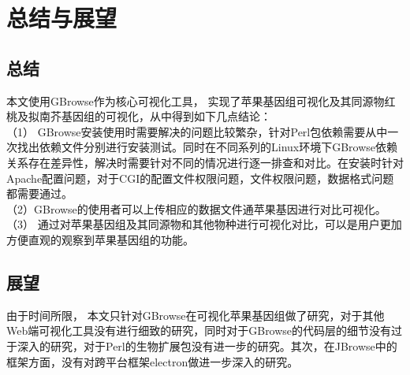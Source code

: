 \chapter{总结与展望}
	\section{总结}
	本文使用GBrowse作为核心可视化工具， 实现了苹果基因组可视化及其同源物红桃及拟南芥基因组的可视化，从中得到如下几点结论：\\
	\indent（1） GBrowse安装使用时需要解决的问题比较繁杂，针对Perl包依赖需要从中一次找出依赖文件分别进行安装测试。同时在不同系列的Linux环境下GBrowse依赖关系存在差异性，解决时需要针对不同的情况进行逐一排查和对比。在安装时针对Apache配置问题，对于CGI的配置文件权限问题，文件权限问题，数据格式问题都需要通过。\\
	\indent（2）GBrowse的使用者可以上传相应的数据文件通苹果基因进行对比可视化。\\
	\indent	（3） 通过对苹果基因组及其同源物和其他物种进行可视化对比，可以是用户更加方便直观的观察到苹果基因组的功能。\\
	\section{展望}
	由于时间所限， 本文只针对GBrowse在可视化苹果基因组做了研究，对于其他Web端可视化工具没有进行细致的研究，同时对于GBrowse的代码层的细节没有过于深入的研究，对于Perl的生物扩展包没有进一步的研究。其次，在JBrowse中的框架方面，没有对跨平台框架electron做进一步深入的研究。